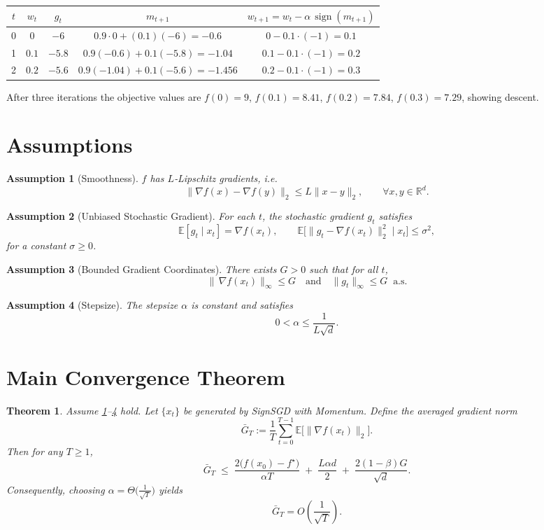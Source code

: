 \documentclass[11pt]{article}
\newtheorem{theorem}{Theorem}
\newtheorem{assumption}{Assumption}
\newcommand{\sign}{\operatorname{sign}}
\newcommand{\E}{\mathbb{E}}
\newcommand{\R}{\mathbb{R}}
\begin{document}
\begin{center}
\begin{tabular}{c|c|c|c|c}
$t$ & $w_t$ & $g_t$ & $m_{t+1}$ & $w_{t+1}=w_t-\alpha\,\sign(m_{t+1})$\\ \hline
0 & $0$   & $-6$ & $0.9\cdot0+(0.1)(-6)=-0.6$ & $0-0.1\cdot(-1)=0.1$\\
1 & $0.1$ & $-5.8$ & $0.9(-0.6)+0.1(-5.8)=-1.04$ & $0.1-0.1\cdot(-1)=0.2$\\
2 & $0.2$ & $-5.6$ & $0.9(-1.04)+0.1(-5.6)=-1.456$ & $0.2-0.1\cdot(-1)=0.3$\\
\end{tabular}
\end{center}
After three iterations the objective values are
$f(0)=9$, $f(0.1)=8.41$, $f(0.2)=7.84$, $f(0.3)=7.29$, showing descent.

\newpage
\section*{Assumptions}
\begin{assumption}[Smoothness]\label{ass:smooth}
$f$ has $L$‑Lipschitz gradients, i.e.
\[
\|\nabla f(x)-\nabla f(y)\|_2\le L\|x-y\|_2,\qquad\forall x,y\in\R^{d}.
\]
\end{assumption}

\begin{assumption}[Unbiased Stochastic Gradient]\label{ass:unbiased}
For each $t$, the stochastic gradient $g_t$ satisfies
\[
\E[g_t\mid x_t]=\nabla f(x_t),\qquad
\E\big[\|g_t-\nabla f(x_t)\|_2^{2}\mid x_t\big]\le\sigma^{2},
\]
for a constant $\sigma\ge0$.
\end{assumption}

\begin{assumption}[Bounded Gradient Coordinates]\label{ass:bounded}
There exists $G>0$ such that for all $t$,
\[
\|\,\nabla f(x_t)\|_{\infty}\le G\quad\text{and}\quad
\|g_t\|_{\infty}\le G\;\;\text{a.s.}
\]
\end{assumption}

\begin{assumption}[Stepsize]\label{ass:stepsize}
The stepsize $\alpha$ is constant and satisfies
\[
0<\alpha\le\frac{1}{L\sqrt{d}}.
\]
\end{assumption}

\section*{Main Convergence Theorem}
\begin{theorem}\label{thm:main}
Assume \ref{ass:smooth}--\ref{ass:stepsize} hold. Let $\{x_t\}$ be generated by SignSGD with Momentum.
Define the averaged gradient norm
\[
\bar{G}_T:=\frac{1}{T}\sum_{t=0}^{T-1}\E\big[\|\nabla f(x_t)\|_2\big].
\]
Then for any $T\ge1$,
\[
\bar{G}_T\;\le\;
\frac{2\big(f(x_0)-f^{\star}\big)}{\alpha T}
   \;+\;
\frac{L\alpha d}{2}
   \;+\;
\frac{2(1-\beta)G}{\sqrt{d}}.
\]
Consequently, choosing $\alpha =\Theta\!\big(\frac{1}{\sqrt{T}}\big)$ yields
\[
\bar{G}_T = O\!\left(\frac{1}{\sqrt{T}}\right).
\]
\end{theorem}
\end{document}
